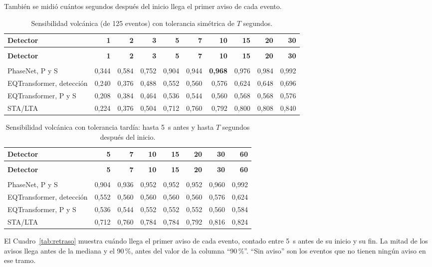 \documentclass[11pt,a4paper,oneside,spanish,oldfontcommands]{memoir}
\newcommand{\cabecera}[2]{%
  \toprule #1 \\ \midrule \endfirsthead
  \multicolumn{#2}{l}{\itshape Cuadro \thetable{} (continuación)}\\
  \toprule #1 \\ \midrule \endhead
  \midrule \multicolumn{#2}{r}{\itshape Continúa en la página siguiente}\\ \endfoot
  \bottomrule \endlastfoot}
\begin{document}
También se midió cuántos segundos después del inicio llega el primer aviso de
cada evento.

{\small
\setlength{\tabcolsep}{3pt}
\begin{longtable}{>{\raggedright\arraybackslash}p{4.4cm}rrrrrrrrr}
\caption{Sensibilidad volcánica (de 125 eventos) con tolerancia simétrica de $T$ segundos.}\label{tab:tol-sim}\\
\cabecera{\textbf{Detector} & \textbf{1} & \textbf{2} & \textbf{3} & \textbf{5} & \textbf{7} & \textbf{10} & \textbf{15} & \textbf{20} & \textbf{30}}{10}
PhaseNet, P y S & 0,344 & 0,584 & 0,752 & 0,904 & 0,944 & \textbf{0,968} & 0,976 & 0,984 & 0,992 \\
EQTransformer, detección & 0,240 & 0,376 & 0,488 & 0,552 & 0,560 & 0,576 & 0,624 & 0,648 & 0,696 \\
EQTransformer, P y S & 0,208 & 0,384 & 0,464 & 0,536 & 0,544 & 0,560 & 0,568 & 0,568 & 0,576 \\
STA/LTA & 0,224 & 0,376 & 0,504 & 0,712 & 0,760 & 0,792 & 0,800 & 0,808 & 0,840 \\
\end{longtable}
}

{\small
\setlength{\tabcolsep}{3pt}
\begin{longtable}{>{\raggedright\arraybackslash}p{4.4cm}rrrrrrr}
\caption{Sensibilidad volcánica con tolerancia tardía: hasta 5~s antes y hasta $T$ segundos después del inicio.}\label{tab:tol-tardia}\\
\cabecera{\textbf{Detector} & \textbf{5} & \textbf{7} & \textbf{10} & \textbf{15} & \textbf{20} & \textbf{30} & \textbf{60}}{8}
PhaseNet, P y S & 0,904 & 0,936 & 0,952 & 0,952 & 0,952 & 0,960 & 0,992 \\
EQTransformer, detección & 0,552 & 0,560 & 0,560 & 0,560 & 0,560 & 0,576 & 0,624 \\
EQTransformer, P y S & 0,536 & 0,544 & 0,552 & 0,552 & 0,552 & 0,560 & 0,584 \\
STA/LTA & 0,712 & 0,760 & 0,784 & 0,784 & 0,792 & 0,816 & 0,824 \\
\end{longtable}
}

El Cuadro~\ref{tab:retraso} muestra cuándo llega el primer aviso de cada
evento, contado entre 5~s antes de su inicio y su fin. La mitad de los avisos
llega antes de la mediana y el 90\,\%, antes del valor de la columna ``90\,\%''.
``Sin aviso'' son los eventos que no tienen ningún aviso en ese tramo.
\end{document}
